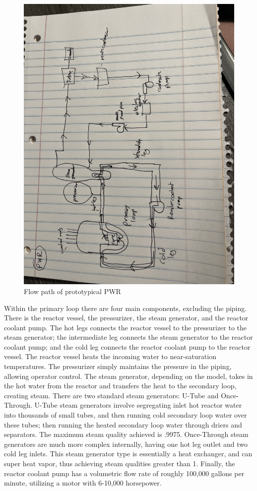 \documentclass{article}
\begin{document}
\begin{figure}[!h!]
    \centering
    \includegraphics[width=0.9\linewidth,angle=180]{homeworks/HW3/hw3PWR.JPG}
    \caption{Flow path of prototypical PWR}
    \label{fig:pwr}
\end{figure}

\newpage
Within the primary loop there are four main components, excluding the piping. There is the reactor vessel, the pressurizer, the steam generator, and the reactor coolant pump. The hot legs connects the reactor vessel to the pressurizer to the steam generator; the intermediate leg connects the steam generator to the reactor coolant pump; and the cold leg connects the reactor coolant pump to the reactor vessel. The reactor vessel heats the incoming water to near-saturation temperatures. The pressurizer simply maintains the pressure in the piping, allowing operator control. The steam generator, depending on the model, takes in the hot water from the reactor and transfers the heat to the secondary loop, creating steam. There are two standard steam generators: U-Tube and Once-Through. U-Tube steam generators involve segregating inlet hot reactor water into thousands of small tubes, and then running cold secondary loop water over these tubes; then running the heated secondary loop water through driers and separators. The maximum steam quality achieved is .9975. Once-Through steam generators are much more complex internally, having one hot leg outlet and two cold leg inlets. This steam generator type is essentially a heat exchanger, and can super heat vapor, thus achieving steam qualities greater than 1. Finally, the reactor coolant pump has a volumetric flow rate of roughly 100,000 gallons per minute, utilizing a motor with 6-10,000 horsepower. 
\end{document}
